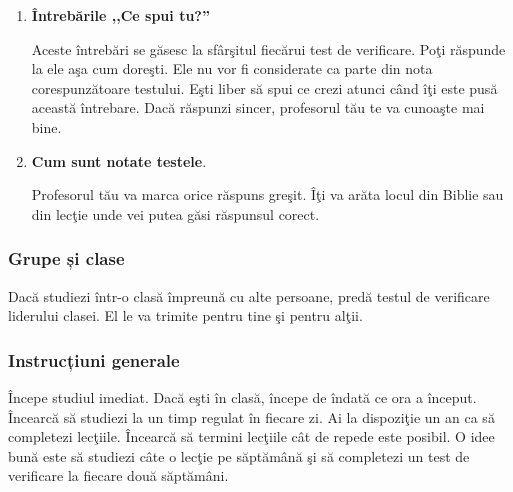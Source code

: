 \begin{enumerate}
	\item \textbf{Întrebările ,,Ce spui tu?''}
	
Aceste întrebări se găsesc la sfârşitul fiecărui test de verificare. Poţi răspunde la ele aşa cum doreşti. Ele nu vor fi considerate ca parte din nota corespunzătoare testului. Eşti liber să spui ce crezi atunci când îţi este pusă această întrebare. Dacă răspunzi sincer, profesorul tău te va cunoaşte mai bine.

	\item \textbf{Cum sunt notate testele}.

Profesorul tău va marca orice răspuns greşit. Îţi va arăta locul din Biblie sau din lecţie unde vei putea găsi răspunsul corect.

\end{enumerate}

\subsubsection*{Grupe și clase}

Dacă studiezi într-o clasă împreună cu alte persoane, predă testul de verificare liderului clasei. El le va trimite pentru tine şi pentru alţii.

\subsubsection*{Instrucțiuni generale}

Începe studiul imediat. Dacă eşti în clasă, începe de îndată ce ora a început. Încearcă să studiezi la un timp regulat în fiecare zi. Ai la dispoziţie un an ca să completezi lecţiile. Încearcă să termini lecţiile cât de repede este posibil. O idee bună este să studiezi câte o lecţie pe săptămână şi să completezi un test de verificare la fiecare două săptămâni.

\vspace*{2cm}

